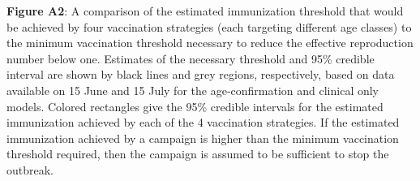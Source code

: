 \textbf{Figure A2}: A comparison of the estimated immunization threshold that would be achieved by four vaccination strategies (each targeting different age classes) to the minimum vaccination threshold necessary to reduce the effective reproduction number below one. Estimates of the necessary threshold and 95\% credible interval are shown by black lines and grey regions, respectively, based on data available on 15 June and 15 July for the age-confirmation and clinical only models.  Colored rectangles give the 95\% credible intervals for the estimated immunization achieved by each of the 4 vaccination strategies. If the estimated immunization achieved by a campaign is higher than the minimum vaccination threshold required, then the campaign is assumed to be sufficient to stop the outbreak.